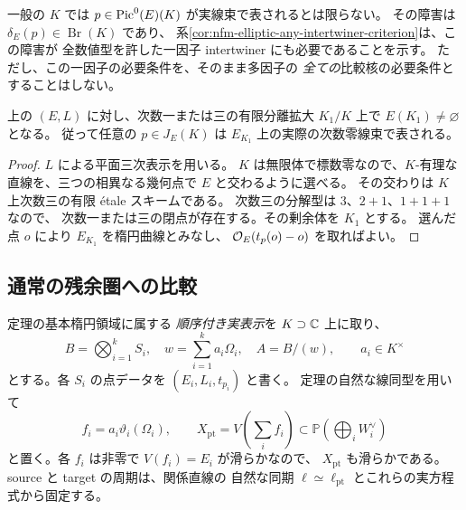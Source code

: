 一般の $K$ では $p\in\operatorname{Pic}^0(E)(K)$ が実線束で表されるとは限らない。
その障害は
$\delta_E(p)\in\operatorname{Br}(K)$ であり、
系\ref{cor:nfm-elliptic-any-intertwiner-criterion}は、この障害が
全数値型を許した一因子 intertwiner にも必要であることを示す。
ただし、この一因子の必要条件を、そのまま多因子の
\emph{全ての}比較核の必要条件とすることはしない。

\begin{lemma}[次数三の偏極を持つ曲線での有限定義体]
\label{mbrc:lem:degree-three-point}
上の $(E,L)$ に対し、次数一または三の有限分離拡大 $K_1/K$ 上で
$E(K_1)\ne\varnothing$ となる。
従って任意の $p\in J_E(K)$ は $E_{K_1}$ 上の実際の次数零線束で表される。
\end{lemma}
\begin{proof}
$L$ による平面三次表示を用いる。
$K$ は無限体で標数零なので、$K$-有理な直線を、三つの相異なる幾何点で
$E$ と交わるように選べる。
その交わりは $K$ 上次数三の有限 \'etale スキームである。
次数三の分解型は $3$、$2+1$、$1+1+1$ なので、
次数一または三の閉点が存在する。その剰余体を $K_1$ とする。
選んだ点 $o$ により $E_{K_1}$ を楕円曲線とみなし、
$\mathcal O_E(t_p(o)-o)$ を取ればよい。
\end{proof}

\subsection{通常の残余圏への比較}

定理の基本楕円領域に属する
\emph{順序付き実表示}を $K\supset\mathbb C$ 上に取り、
\[
 B=\bigotimes_{i=1}^k S_i,\quad
 w=\sum_{i=1}^k a_i\Omega_i,\quad
 A=B/(w),\qquad a_i\in K^\times
\]
とする。各 $S_i$ の点データを $(E_i,L_i,t_{p_i})$ と書く。
定理の自然な線同型を用いて
\[
 f_i=a_i\vartheta_i(\Omega_i),\qquad
 X_{\mathrm{pt}}=V\!\left(\sum_i f_i\right)
       \subset\mathbb P\!\left(\bigoplus_i W_i^\vee\right)
\]
と置く。各 $f_i$ は非零で $V(f_i)=E_i$ が滑らかなので、
$X_{\mathrm{pt}}$ も滑らかである。
source と target の周期は、関係直線の
自然な同期 $\ell\simeq\ell_{\mathrm{pt}}$ とこれらの実方程式から固定する。

